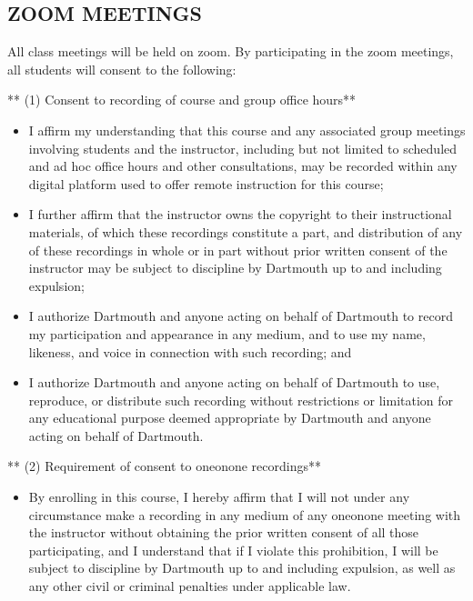 \documentclass[letterpaper,10pt,english]{sphinxmanual}
\begin{document}
\subsection{ZOOM MEETINGS}
\label{\detokenize{content/Syllabus:zoom-meetings}}
All class meetings will be held on zoom. By participating in the zoom meetings, all students will consent to the following:

** (1) Consent to recording of course and group office hours**
\begin{itemize}
\item {} 
I affirm my understanding that this course and any associated group meetings involving students and the instructor, including but not limited to scheduled and ad hoc office hours and other consultations, may be recorded within any digital platform used to offer remote instruction for this course;

\item {} 
I further affirm that the instructor owns the copyright to their instructional materials, of which these recordings constitute a part, and distribution of any of these recordings in whole or in part without prior written consent of the instructor may be subject to discipline by Dartmouth up to and including expulsion;

\item {} 
I authorize Dartmouth and anyone acting on behalf of Dartmouth to record my participation and appearance in any medium, and to use my name, likeness, and voice in connection with such recording; and

\item {} 
I authorize Dartmouth and anyone acting on behalf of Dartmouth to use, reproduce, or distribute such recording without restrictions or limitation for any educational purpose deemed appropriate by Dartmouth and anyone acting on behalf of Dartmouth.

\end{itemize}

** (2) Requirement of consent to one\sphinxhyphen{}on\sphinxhyphen{}one recordings**
\begin{itemize}
\item {} 
By enrolling in this course, I hereby affirm that I will not under any circumstance make a recording in any medium of any one\sphinxhyphen{}on\sphinxhyphen{}one meeting with the instructor without obtaining the prior written consent of all those participating, and I understand that if I violate this prohibition, I will be subject to discipline by Dartmouth up to and including expulsion, as well as any other civil or criminal penalties under applicable law.

\end{itemize}
\end{document}
